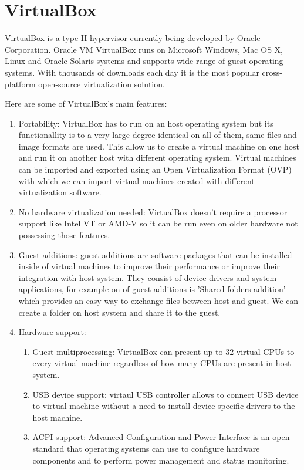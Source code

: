 \section{VirtualBox}
VirtualBox is a type II hypervisor currently being developed by Oracle Corporation. Oracle VM VirtualBox runs on Microsoft Windows, Mac OS X, Linux and Oracle Solaris systems and supports wide range of guest operating systems. With thousands of downloads each day it is the most popular cross-platform open-source virtualization solution.

Here are some of VirtualBox's main features:
\begin{enumerate}
\item Portability: VirtualBox has to run on an host operating system but its functionallity is to a very large degree identical on all of them, same files and image formats are used. This allow us to create a virtual machine on one host and run it on another host with different operating system. Virtual machines can be imported and exported using an Open Virtualization Format (OVP) with which we can import virtual machines created with different virtualization software.
\item No hardware virtualization needed: VirtualBox doesn't require a processor support like Intel VT or AMD-V so it can be run even on older hardware not possessing those features.
\item Guest additions: guest additions are software packages that can be installed inside of virtual machines to improve their performance or improve their integration with host system. They consist of device drivers and system applications, for example on of guest additions is 'Shared folders addition' which provides an easy way to exchange files between host and guest. We can create a folder on host system and share it to the guest.
\item Hardware support:
\begin{enumerate}
\item Guest multiprocessing: VirtualBox can present up to 32 virtual CPUs to every virtual machine regardless of how many CPUs are present in host system.
\item USB device support: virtaul USB controller allows to connect USB device to virtual machine without a need to install device-specific drivers to the host machine.
\item ACPI support: Advanced Configuration and Power Interface is an open standard that operating systems can use to configure hardware components and to perform power management and status monitoring.

\end{enumerate}
\end{enumerate}
